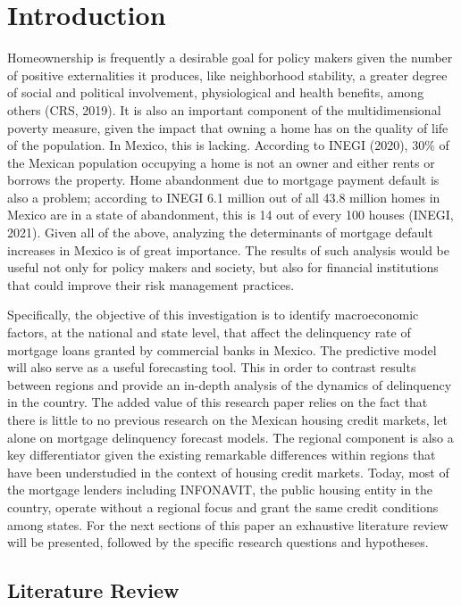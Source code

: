 \documentclass[
]{article}
\author{}
\date{\vspace{-2.5em}}
\begin{document}
\hypertarget{introduction}{%
\section{Introduction}\label{introduction}}

Homeownership is frequently a desirable goal for policy makers given the
number of positive externalities it produces, like neighborhood
stability, a greater degree of social and political involvement,
physiological and health benefits, among others (CRS, 2019). It is also
an important component of the multidimensional poverty measure, given
the impact that owning a home has on the quality of life of the
population. In Mexico, this is lacking. According to INEGI (2020), 30\%
of the Mexican population occupying a home is not an owner and either
rents or borrows the property. Home abandonment due to mortgage payment
default is also a problem; according to INEGI 6.1 million out of all
43.8 million homes in Mexico are in a state of abandonment, this is 14
out of every 100 houses (INEGI, 2021). Given all of the above, analyzing
the determinants of mortgage default increases in Mexico is of great
importance. The results of such analysis would be useful not only for
policy makers and society, but also for financial institutions that
could improve their risk management practices.

Specifically, the objective of this investigation is to identify
macroeconomic factors, at the national and state level, that affect the
delinquency rate of mortgage loans granted by commercial banks in
Mexico. The predictive model will also serve as a useful forecasting
tool. This in order to contrast results between regions and provide an
in-depth analysis of the dynamics of delinquency in the country. The
added value of this research paper relies on the fact that there is
little to no previous research on the Mexican housing credit markets,
let alone on mortgage delinquency forecast models. The regional
component is also a key differentiator given the existing remarkable
differences within regions that have been understudied in the context of
housing credit markets. Today, most of the mortgage lenders including
INFONAVIT, the public housing entity in the country, operate without a
regional focus and grant the same credit conditions among states. For
the next sections of this paper an exhaustive literature review will be
presented, followed by the specific research questions and hypotheses.

\hypertarget{literature-review}{%
\subsection{Literature Review}\label{literature-review}}
\end{document}
